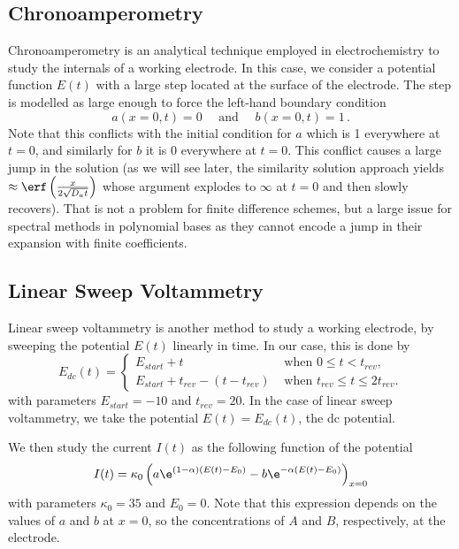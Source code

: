 \documentclass{prettytex/ox/mmsc-special-topic}
\begin{document}
  \subsection{Chronoamperometry}
  Chronoamperometry is an analytical technique employed in electrochemistry to study the internals of a working electrode. In this case, we consider a potential function $E(t)$ with a large step located at the surface of the electrode.
  The step is modelled as large enough to force the left-hand boundary condition
  \begin{equation}
    a(x=0, t) = 0 \quad\text{ and }\quad b(x=0, t) = 1\,.
    \label{eq:chrono-bc}
  \end{equation}
  Note that this conflicts with the initial condition for $a$ which is 1 everywhere at $t = 0$, and similarly for $b$ it is 0 everywhere at $t = 0$.
  This conflict causes a large jump in the solution (as we will see later, the similarity solution approach yields $\approx \erf\left(\frac{x}{2 \sqrt{D_a t}}\right)$ whose argument explodes to $\infty$ at $t = 0$ and then slowly recovers).
  That is not a problem for finite difference schemes, but a large issue for spectral methods in polynomial bases as they cannot encode a jump in their expansion with finite coefficients.

  \subsection{Linear Sweep Voltammetry}
  Linear sweep voltammetry is another method to study a working electrode, by sweeping the potential $E(t)$ linearly in time. In our case, this is done by
  \begin{equation}
    E_{dc}(t) = \begin{cases}
      E_{start} + t                     & \text{ when } 0 \leq t< t_{rev},           \\
      E_{start} + t_{rev} - (t-t_{rev}) & \text{ when } t_{rev} \leq t\leq 2t_{rev}.
    \end{cases}
    \label{eq:linear-potential}
  \end{equation}
  with parameters $E_{start} = -10$ and $t_{rev} = 20$.
  In the case of linear sweep voltammetry, we take the potential $E(t) = E_{dc}(t)$, the \gls{dc} potential.

  We then study the current $I(t)$ as the following function of the potential
  \begin{equation}
    I(t) = \kappa_0 \left(a \e^{(1-\alpha) (E(t) - E_0)} - b \e^{-\alpha (E(t) - E_0)}\right)_{x=0}
    \label{eq:current}
  \end{equation}
  with parameters $\kappa_0 = 35$ and $E_0 = 0$.
  Note that this expression depends on the values of $a$ and $b$ at $x = 0$, so the concentrations of $A$ and $B$, respectively, at the electrode.
\end{document}
